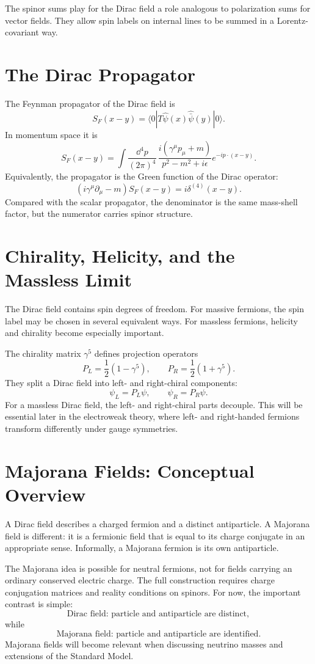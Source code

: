 The spinor sums play for the Dirac field a role analogous to polarization sums
for vector fields. They allow spin labels on internal lines to be summed in a
Lorentz-covariant way.

\section{The Dirac Propagator}

The Feynman propagator of the Dirac field is
\[
    S_F(x-y)
    = \langle0|T\hat\psi(x)\hat{\bar\psi}(y)|0\rangle.
\]
In momentum space it is
\[
    S_F(x-y)
    = \int\frac{\dd^4p}{(2\pi)^4}\,
      \frac{i(\gamma^\mu p_\mu+m)}{p^2-m^2+i\epsilon}
      e^{-ip\cdot(x-y)}.
\]
Equivalently, the propagator is the Green function of the Dirac operator:
\[
    (i\gamma^\mu\partial_\mu-m)S_F(x-y)
    = i\delta^{(4)}(x-y).
\]
Compared with the scalar propagator, the denominator is the same mass-shell
factor, but the numerator carries spinor structure.

\section{Chirality, Helicity, and the Massless Limit}

The Dirac field contains spin degrees of freedom. For massive fermions, the spin
label may be chosen in several equivalent ways. For massless fermions, helicity
and chirality become especially important.

The chirality matrix \(\gamma^5\) defines projection operators
\[
    P_L=\frac{1}{2}(1-\gamma^5),
    \qquad
    P_R=\frac{1}{2}(1+\gamma^5).
\]
They split a Dirac field into left- and right-chiral components:
\[
    \psi_L=P_L\psi,
    \qquad
    \psi_R=P_R\psi.
\]
For a massless Dirac field, the left- and right-chiral parts decouple. This will
be essential later in the electroweak theory, where left- and right-handed
fermions transform differently under gauge symmetries.

\section{Majorana Fields: Conceptual Overview}

A Dirac field describes a charged fermion and a distinct antiparticle. A
Majorana field is different: it is a fermionic field that is equal to its charge
conjugate in an appropriate sense. Informally, a Majorana fermion is its own
antiparticle.

The Majorana idea is possible for neutral fermions, not for fields carrying an
ordinary conserved electric charge. The full construction requires charge
conjugation matrices and reality conditions on spinors. For now, the important
contrast is simple:
\[
    \text{Dirac field: particle and antiparticle are distinct},
\]
while
\[
    \text{Majorana field: particle and antiparticle are identified}.
\]
Majorana fields will become relevant when discussing neutrino masses and
extensions of the Standard Model.

